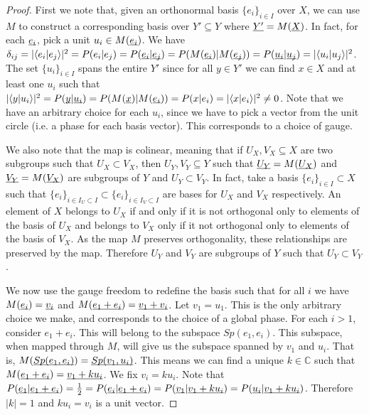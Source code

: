 \documentclass[aps,prl,amsmath,amssymb,twocolumn,nofootinbib]{revtex4}
\theoremstyle{plain}
\theoremstyle{definition}
\theoremstyle{remark}
\newcommand{\pj}[1] {\underbar{$#1$}}
\def\>{\rangle}
\def\<{\langle}
\begin{document}
	\begin{proof}
		First we note that, given an orthonormal basis $\{e_i\}_{i \in I}$ over $X$, we can use $M$ to construct a corresponding basis over $Y' \subseteq Y$ where $\pj{Y'} = M(\pj{X})$. In fact, for each $\pj{e_i}$, pick a unit $u_i \in M(\pj{e_i})$. We have $\delta_{ij} = |\<e_i | e_j \>|^2 = P(e_i | e_j) = P(\pj{e_i}|\pj{e_j}) = P(M(\pj{e_i})|M(\pj{e_j})) = P(\pj{u_i}|\pj{u_j})= |\<u_i | u_j \>|^2$. The set $\{u_i\}_{i \in I}$ spans the entire $Y'$ since for all $y \in Y'$ we can find $x \in X$ and at least one $u_i$ such that $|\<y | u_i \>|^2 = P(\pj{y}|\pj{u_i}) = P(M(\pj{x})|M(\pj{e_i})) = P(x | e_i) = |\<x | e_i \>|^2 \neq 0$. Note that we have an arbitrary choice for each $u_i$, since we have to pick a vector from the unit circle (i.e. a phase for each basis vector). This corresponds to a choice of gauge.
		
		We also note that the map is colinear, meaning that if $U_X, V_X \subseteq X$ are two subgroups such that $U_X \subset V_X$, then $U_Y, V_Y \subseteq Y$ such that $\pj{U_Y} = M(\pj{U_X})$ and $\pj{V_Y} = M(\pj{V_X})$ are subgroups of $Y$ and $U_Y \subset V_Y$. In fact, take a basis $\{e_i\}_{i \in I} \subset X$ such that $\{e_i\}_{i \in I_U \subset I} \subset \{e_i\}_{i \in I_V \subset I}$ are bases for $U_X$ and $V_X$ respectively. An element of $X$ belongs to $U_X$ if and only if it is not orthogonal only to elements of the basis of $U_X$ and belongs to $V_X$ only if it not orthogonal only to elements of the basis of $V_X$. As the map $M$ preserves orthogonality, these relationships are preserved by the map. Therefore $U_Y$ and $V_Y$ are subgroups of $Y$ such that $U_Y \subset V_Y$.
		
		We now use the gauge freedom to redefine the basis such that for all $i$ we have $M(\pj{e_i}) = \pj{v_i}$ and $M(\pj{e_1 + e_i}) = \pj{v_1 + v_i}$. Let $v_1 = u_1$. This is the only arbitrary choice we make, and corresponds to the choice of a global phase. For each $i>1$, consider $e_1 + e_i$. This will belong to the subspace $Sp(e_1, e_i)$. This subspace, when mapped through $M$, will give us the subspace spanned by $v_1$ and $u_i$. That is, $M(\pj{Sp(e_1, e_i)})=\pj{Sp(v_1, u_i)}$. This means we can find a unique $k \in \mathbb{C}$ such that $M(\pj{e_1+e_i})=\pj{v_1+ku_i}$. We fix $v_i = k u_i$. Note that $P(\pj{e_1} | \pj{e_1+e_i}) = \frac{1}{2}=  P(\pj{e_i} | \pj{e_1+e_i})=P(\pj{v_1} | \pj{v_1+k u_i})=P(\pj{u_i} | \pj{v_1+k u_i})$. Therefore $|k| = 1$ and $k u_i = v_i$ is a unit vector.
		

\end{proof}
\end{document}
